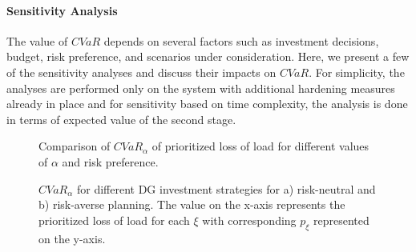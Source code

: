 \paragraph{Sensitivity Analysis}
The value of $CVaR$ depends on several factors such as investment decisions, budget, risk preference, and scenarios under consideration. Here, we present a few of the sensitivity analyses and discuss their impacts on $CVaR$. For simplicity, the analyses are performed only on the system with additional hardening measures already in place and for sensitivity based on time complexity, the analysis is done in terms of expected value of the second stage.

\begin{figure}[t]
    \centering
    \vspace{-0.6cm}
    \caption{Comparison of $CVaR_\alpha$ of prioritized loss of load for different values of $\alpha$ and risk preference.}
    \label{fig:CVaR_vs_alpha}
\end{figure}

\begin{figure}[!ht]
     \centering
     {
        \label{fig:DG_neutral}
    }
    {
        \label{fig:DG_averse}
     }
     \caption{$CVaR_\alpha$ for different DG investment strategies for a) risk-neutral and b) risk-averse planning. The value on the x-axis represents the prioritized loss of load for each $\xi$ with corresponding $p_\xi$ represented on the y-axis.}
     \label{fig:DG_tradeoffs}
     \vspace{-0.4cm}
\end{figure}

\begin{figure*}[!t]
        \centering
        \caption{}
        \label{fig:scen_probab}
\end{figure*}

